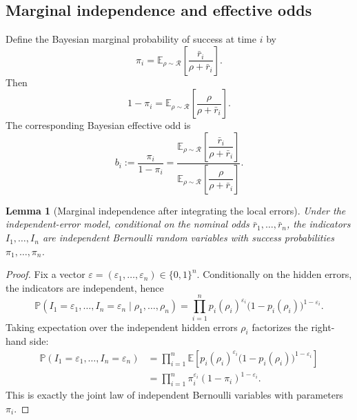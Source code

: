 \documentclass[11pt,a4paper]{article}
\newtheorem{lemma}{Lemma}
\begin{document}
\subsection{Marginal independence and effective odds}

Define the Bayesian marginal probability of success at time $i$ by
\[
  \pi_i
  =\mathbb E_{\rho\sim\mathcal R}
  \left[
    \frac{\bar r_i}{\rho+\bar r_i}
  \right].
\]
Then
\[
  1-\pi_i
  =\mathbb E_{\rho\sim\mathcal R}
  \left[
    \frac{\rho}{\rho+\bar r_i}
  \right].
\]
The corresponding Bayesian effective odd is
\[
  \boxed{
  b_i
  :=\frac{\pi_i}{1-\pi_i}
  =
  \frac{
    \mathbb E_{\rho\sim\mathcal R}
    \left[\dfrac{\bar r_i}{\rho+\bar r_i}\right]
  }{
    \mathbb E_{\rho\sim\mathcal R}
    \left[\dfrac{\rho}{\rho+\bar r_i}\right]
  }.
  }
  \tag{13}
\]

\begin{lemma}[Marginal independence after integrating the local errors]
\label{lem:marginal-independence}
Under the independent-error model, conditional on the nominal odds $\bar r_1,
\dots,\bar r_n$, the
indicators $I_1,\dots,I_n$ are independent Bernoulli random variables with
success probabilities $\pi_1,
\dots,\pi_n$.
\end{lemma}

\begin{proof}
Fix a vector $\varepsilon=(\varepsilon_1,
\dots,\varepsilon_n)\in\{0,1\}^n$.
Conditionally on the hidden errors, the indicators are independent, hence
\[
  \mathbb P(I_1=\varepsilon_1,
\dots,I_n=\varepsilon_n\mid \rho_1,
\dots,\rho_n)
  =
  \prod_{i=1}^n
  p_i(\rho_i)^{\varepsilon_i}
  \bigl(1-p_i(\rho_i)\bigr)^{1-\varepsilon_i}.
\]
Taking expectation over the independent hidden errors $\rho_i$ factorizes the
right-hand side:
\begin{align*}
  \mathbb P(I_1=\varepsilon_1,
\dots,I_n=\varepsilon_n)
  &=
  \prod_{i=1}^n
  \mathbb E\left[
    p_i(\rho_i)^{\varepsilon_i}
    \bigl(1-p_i(\rho_i)\bigr)^{1-\varepsilon_i}
  \right] \\
  &=
  \prod_{i=1}^n
  \pi_i^{\varepsilon_i}(1-\pi_i)^{1-\varepsilon_i}.
\end{align*}
This is exactly the joint law of independent Bernoulli variables with parameters
$\pi_i$.
\end{proof}
\end{document}
